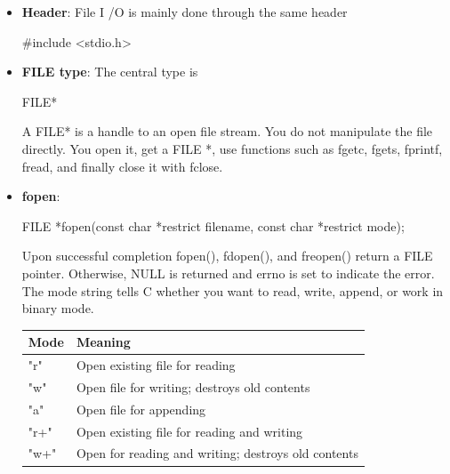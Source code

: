 \documentclass{report}
\begin{document}
\begin{itemize}
    \end{itemize}

    \pagebreak 
    \begin{itemize}
        \item \textbf{Header}: File I /O is mainly done through the same header
            \bigbreak \noindent 
            \begin{cppcode}
            #include <stdio.h>
            \end{cppcode}
        \item \textbf{FILE type}: The central type is
            \bigbreak \noindent 
            \begin{cppcode}
            FILE*
            \end{cppcode}
            \bigbreak \noindent 
            A FILE* is a handle to an open file stream. You do not manipulate the file directly. You open it, get a FILE *, use functions such as fgetc, fgets, fprintf, fread, and finally close it with fclose.
        \item \textbf{fopen}: 
            \bigbreak \noindent 
            \begin{cppcode}
            FILE *fopen(const char *restrict filename, const char *restrict mode);
            \end{cppcode}
            \bigbreak \noindent 
            Upon successful completion fopen(), fdopen(), and freopen() return a FILE pointer.  Otherwise, NULL is returned and errno is set to indicate the error.
            \bigbreak \noindent 
            The mode string tells C whether you want to read, write, append, or work in binary mode. 
            \bigbreak \noindent 
            \begin{center}
                \begin{tabularx}{\textwidth}{@{}lX@{}}
                    \toprule
                    \textbf{Mode}	&\textbf{Meaning} \\
                    \midrule
                    "r"	    &Open existing file for reading\\[2ex]
                    "w"	    &Open file for writing; destroys old contents\\[2ex]
                    "a"	    &Open file for appending\\[2ex]
                    "r+"	&Open existing file for reading and writing\\[2ex]
                    "w+"	&Open for reading and writing; destroys old contents\\[2ex]

\end{tabularx}
\end{center}
\end{itemize}
\end{document}
